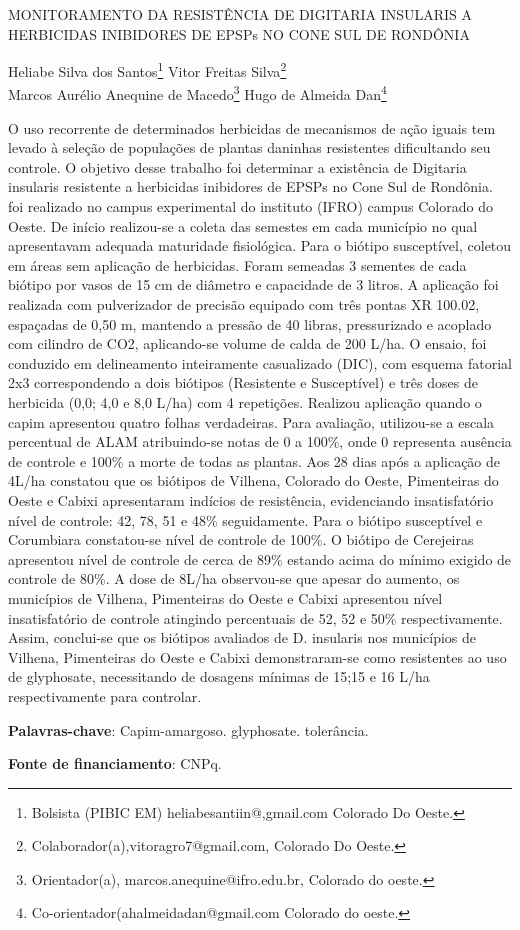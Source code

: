 \documentclass[article,12pt,onesidea,4paper,english,brazil]{abntex2}
\begin{document}
	
	
	\frenchspacing 
	
	\begin{center}
		\LARGE MONITORAMENTO DA RESISTÊNCIA DE \MakeUppercase{Digitaria insularis} A HERBICIDAS
		INIBIDORES DE EPSPs NO CONE SUL DE RONDÔNIA
		
		\normalsize
		Heliabe Silva dos Santos\footnote{Bolsista (PIBIC EM) heliabesantiin@,gmail.com Colorado Do Oeste.} 
		Vitor Freitas Silva\footnote{Colaborador(a),vitoragro7@gmail.com, Colorado Do Oeste.} \\
		Marcos Aurélio Anequine de Macedo\footnote{Orientador(a), marcos.anequine@ifro.edu.br, Colorado do oeste.} 
	Hugo de Almeida Dan\footnote{Co-orientador(ahalmeidadan@gmail.com Colorado do oeste.} 
	\end{center}
	
	\noindent  O uso recorrente de determinados herbicidas de mecanismos de ação iguais tem
	levado à seleção de populações de plantas daninhas resistentes dificultando seu
	controle. O objetivo desse trabalho foi determinar a existência de Digitaria insularis
	resistente a herbicidas inibidores de EPSPs no Cone Sul de Rondônia. foi realizado
	no campus experimental do instituto (IFRO) campus Colorado do Oeste. De início
	realizou-se a coleta das semestes em cada município no qual apresentavam
	adequada maturidade fisiológica. Para o biótipo susceptível, coletou em áreas sem
	aplicação de herbicidas. Foram semeadas 3 sementes de cada biótipo por vasos de
	15 cm de diâmetro e capacidade de 3 litros. A aplicação foi realizada com
	pulverizador de precisão equipado com três pontas XR 100.02, espaçadas de 0,50
	m, mantendo a pressão de 40 libras, pressurizado e acoplado com cilindro de CO2,
	aplicando-se volume de calda de 200 L/ha. O ensaio, foi conduzido em delineamento
	inteiramente casualizado (DIC), com esquema fatorial 2x3 correspondendo a dois
	biótipos (Resistente e Susceptível) e três doses de herbicida (0,0; 4,0 e 8,0 L/ha)
	com 4 repetições. Realizou aplicação quando o capim apresentou quatro folhas
	verdadeiras. Para avaliação, utilizou-se a escala percentual de ALAM atribuindo-se
	notas de 0 a 100\%, onde 0 representa ausência de controle e 100\% a morte de
	todas as plantas. Aos 28 dias após a aplicação de 4L/ha constatou que os biótipos
	de Vilhena, Colorado do Oeste, Pimenteiras do Oeste e Cabixi apresentaram
	indícios de resistência, evidenciando insatisfatório nível de controle: 42, 78, 51 e
	48\% seguidamente. Para o biótipo susceptível e Corumbiara constatou-se nível de
	controle de 100\%. O biótipo de Cerejeiras apresentou nível de controle de cerca de
	89\% estando acima do mínimo exigido de controle de 80\%. A dose de 8L/ha
	observou-se que apesar do aumento, os municípios de Vilhena, Pimenteiras do
	Oeste e Cabixi apresentou nível insatisfatório de controle atingindo percentuais de
	52, 52 e 50\% respectivamente. Assim, conclui-se que os biótipos avaliados de D.
	insularis nos municípios de Vilhena, Pimenteiras do Oeste e Cabixi demonstraram-se
	como resistentes ao uso de glyphosate, necessitando de dosagens mínimas de
	15;15 e 16 L/ha respectivamente para controlar.
	
	\vspace{\onelineskip}
	
	\noindent
	\textbf{Palavras-chave}: Capim-amargoso. glyphosate. tolerância.
		\vspace{\onelineskip}
	
	\noindent
	\textbf{Fonte de financiamento}: CNPq.
	
\end{document}

